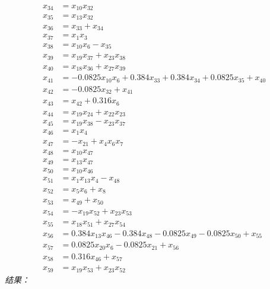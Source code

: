 \documentclass[11pt]{article}
\begin{document}
\begin{align*}
x_{34} &= x_{10} x_{32} \\
x_{35} &= x_{13} x_{32} \\
x_{36} &= x_{33} + x_{34} \\
x_{37} &= x_{1} x_{3} \\
x_{38} &= x_{10} x_{6} - x_{35} \\
x_{39} &= x_{19} x_{37} + x_{23} x_{38} \\
x_{40} &= x_{18} x_{36} + x_{27} x_{39} \\
x_{41} &= - 0.0825 x_{10} x_{6} + 0.384 x_{33} + 0.384 x_{34} + 0.0825 x_{35} + x_{40} \\
x_{42} &= - 0.0825 x_{32} + x_{41} \\
x_{43} &= x_{42} + 0.316 x_{6} \\
x_{44} &= x_{19} x_{24} + x_{22} x_{23} \\
x_{45} &= x_{19} x_{38} - x_{23} x_{37} \\
x_{46} &= x_{1} x_{4} \\
x_{47} &= - x_{21} + x_{4} x_{6} x_{7} \\
x_{48} &= x_{10} x_{47} \\
x_{49} &= x_{13} x_{47} \\
x_{50} &= x_{10} x_{46} \\
x_{51} &= x_{1} x_{13} x_{4} - x_{48} \\
x_{52} &= x_{5} x_{6} + x_{8} \\
x_{53} &= x_{49} + x_{50} \\
x_{54} &= - x_{19} x_{52} + x_{23} x_{53} \\
x_{55} &= x_{18} x_{51} + x_{27} x_{54} \\
x_{56} &= 0.384 x_{13} x_{46} - 0.384 x_{48} - 0.0825 x_{49} - 0.0825 x_{50} + x_{55} \\
x_{57} &= 0.0825 x_{20} x_{6} - 0.0825 x_{21} + x_{56} \\
x_{58} &= 0.316 x_{46} + x_{57} \\
x_{59} &= x_{19} x_{53} + x_{23} x_{52}
\end{align*}
\textit{结果：}
\end{document}
